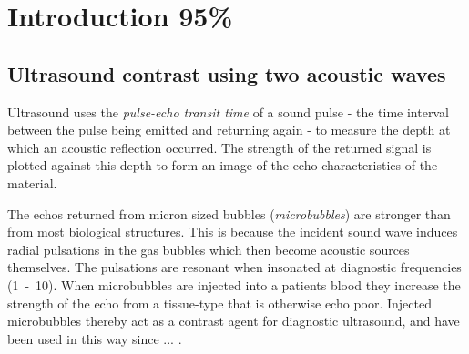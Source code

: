 



\chapter{Introduction 95\%}\label{ch:introduction}
\section{Ultrasound contrast using two acoustic waves}\label{sec:int:Introduction}

 

 

Ultrasound uses the {\em pulse-echo transit time} of a sound pulse -
the time interval between the pulse being emitted and returning again -
to measure the depth at which an acoustic reflection occurred.
The strength of the returned signal is plotted
against this depth to form an image of the echo characteristics of the material.



The echos returned from micron sized bubbles ({\em microbubbles}) are stronger than from most biological structures.
This is because the incident sound wave induces radial pulsations in the gas bubbles
which then become acoustic sources themselves.
The pulsations are resonant when insonated at diagnostic frequencies (\unit{1-10}\mega\hertz).
When microbubbles are injected into a patients blood
they increase the strength of the echo
from a tissue-type that is otherwise echo poor.
Injected microbubbles thereby act as a contrast agent for diagnostic ultrasound,
and have been used in this way since ... \cite{}.


